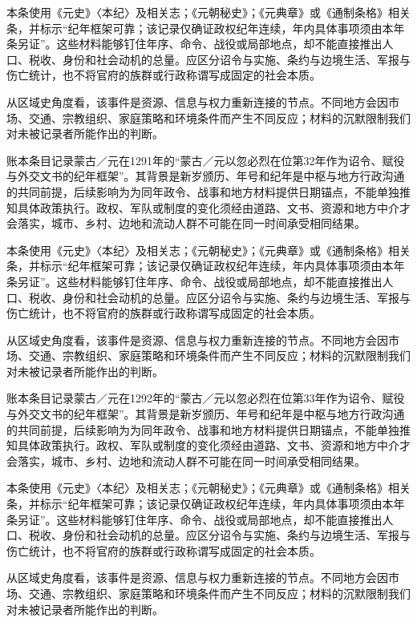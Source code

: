 本条使用《元史》〈本纪〉及相关志；《元朝秘史》；《元典章》或《通制条格》相关条，并标示“纪年框架可靠；该记录仅确证政权纪年连续，年内具体事项须由本年条另证”。这些材料能够钉住年序、命令、战役或局部地点，却不能直接推出人口、税收、身份和社会动机的总量。应区分诏令与实施、条约与边境生活、军报与伤亡统计，也不将官府的族群或行政称谓写成固定的社会本质。

从区域史角度看，该事件是资源、信息与权力重新连接的节点。不同地方会因市场、交通、宗教组织、家庭策略和环境条件而产生不同反应；材料的沉默限制我们对未被记录者所能作出的判断。

账本条目记录蒙古／元在1291年的“蒙古／元以忽必烈在位第32年作为诏令、赋役与外交文书的纪年框架”。其背景是新岁颁历、年号和纪年是中枢与地方行政沟通的共同前提，后续影响为为同年政令、战事和地方材料提供日期锚点，不能单独推知具体政策执行。政权、军队或制度的变化须经由道路、文书、资源和地方中介才会落实，城市、乡村、边地和流动人群不可能在同一时间承受相同结果。

本条使用《元史》〈本纪〉及相关志；《元朝秘史》；《元典章》或《通制条格》相关条，并标示“纪年框架可靠；该记录仅确证政权纪年连续，年内具体事项须由本年条另证”。这些材料能够钉住年序、命令、战役或局部地点，却不能直接推出人口、税收、身份和社会动机的总量。应区分诏令与实施、条约与边境生活、军报与伤亡统计，也不将官府的族群或行政称谓写成固定的社会本质。

从区域史角度看，该事件是资源、信息与权力重新连接的节点。不同地方会因市场、交通、宗教组织、家庭策略和环境条件而产生不同反应；材料的沉默限制我们对未被记录者所能作出的判断。

账本条目记录蒙古／元在1292年的“蒙古／元以忽必烈在位第33年作为诏令、赋役与外交文书的纪年框架”。其背景是新岁颁历、年号和纪年是中枢与地方行政沟通的共同前提，后续影响为为同年政令、战事和地方材料提供日期锚点，不能单独推知具体政策执行。政权、军队或制度的变化须经由道路、文书、资源和地方中介才会落实，城市、乡村、边地和流动人群不可能在同一时间承受相同结果。

本条使用《元史》〈本纪〉及相关志；《元朝秘史》；《元典章》或《通制条格》相关条，并标示“纪年框架可靠；该记录仅确证政权纪年连续，年内具体事项须由本年条另证”。这些材料能够钉住年序、命令、战役或局部地点，却不能直接推出人口、税收、身份和社会动机的总量。应区分诏令与实施、条约与边境生活、军报与伤亡统计，也不将官府的族群或行政称谓写成固定的社会本质。

从区域史角度看，该事件是资源、信息与权力重新连接的节点。不同地方会因市场、交通、宗教组织、家庭策略和环境条件而产生不同反应；材料的沉默限制我们对未被记录者所能作出的判断。

